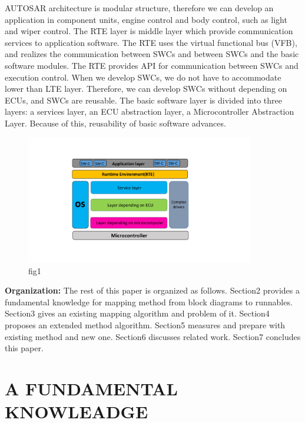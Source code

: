 \documentclass[conference,compsoc]{IEEEtran}
\begin{document}
AUTOSAR architecture is modular structure, therefore we can develop an application in component units, engine control and body control, such as light and wiper control.
 The RTE layer is middle layer which provide communication services to application software.
The RTE uses the virtual functional bus (VFB), and realizes the communication between SWCs and between  SWCs and the basic software modules.
The RTE provides API for communication between SWCs and execution control.
When we develop SWCs, we do not have to accommodate lower than LTE layer.
Therefore, we can develop SWCs without depending on ECUs, and SWCs are reusable.
 The basic software layer is divided into three layers: a services layer, an ECU abstraction layer, a Microcontroller Abstraction Layer.
Because of this, reusability of basic software advances. 

\begin{figure}
	\centering
	\includegraphics[width=10cm,clip]{figure3.pdf}
	\caption{fig1}
	\label{fig1}
\end{figure}

 {\bf Organization:} The rest of this paper is organized as follows.
Section2 provides a fundamental knowledge for mapping method from block diagrams to runnables.
Section3 gives an existing mapping algorithm and problem of it.
Section4 proposes an extended method algorithm.
Section5 measures and prepare with existing method and new one.
Section6 discusses related work.
Section7 concludes this paper.   
\section {A FUNDAMENTAL KNOWLEADGE}
\end{document}
